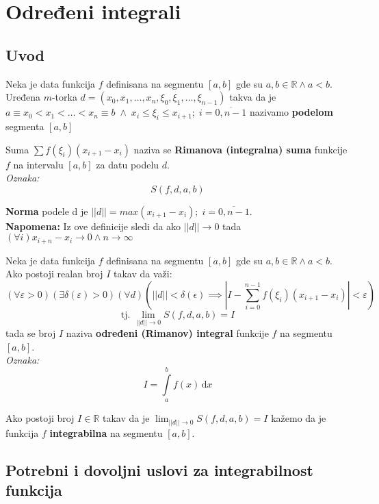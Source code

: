 \section{Određeni integrali}
\subsection{Uvod}
\begin{definition}
	Neka je data funkcija $f$ definisana na segmentu $[a, b]$ gde su $a, b \in \mathbb{R} \land a<b$. Uređena $m$-torka $d = (x_0, x_1, \ldots, x_n, \xi_0, \xi_1, \ldots, \xi_{n-1})$ takva da je $a \equiv x_0 < x_1 < \ldots < x_n \equiv b\; \land \;x_i \leq \xi_i \leq x_{i+1}; \; i=\overline{0, n-1}$ nazivamo \textbf{podelom} segmenta $[a, b]$
\end{definition}
\begin{definition}
	 Suma $\sum f(\xi_i)(x_{i+1}-x_i)$ naziva se \textbf{Rimanova (integralna) suma} funkcije $f$ na intervalu $[a, b]$ za datu podelu $d$.\\
	 \textit{Oznaka:} $$S(f, d, a, b)$$
\end{definition}
\begin{definition}
	\textbf{Norma} podele d je $||d|| = max(x_{i+1}-x_i); \; i=\overline{0,n-1}$.\\
	\textbf{Napomena:} Iz ove definicije sledi da ako $||d|| \to 0$ tada $(\forall i) x_{i+n}-x_i \to 0 \land n \to \infty$
\end{definition}
\begin{definition}
	Neka je data funkcija $f$ definisana na segmentu $[a, b]$ gde su $a, b \in \mathbb{R} \land a<b$. Ako postoji realan broj $I$ takav da važi:
	$$(\forall \varepsilon > 0)(\exists \delta(\varepsilon)>0)(\forall d)\left(||d||<\delta(\epsilon) \implies \left|I- \sum^{n-1}_{i = 0}f(\xi_i)(x_{i+1}-x_i) \right|<\varepsilon\right)$$
	$$\text{tj. } \lim_{||d||\to 0} S(f, d, a, b) = I$$ tada se broj $I$ naziva \textbf{određeni (Rimanov) integral} funkcije $f$ na segmentu $[a, b]$. \\
	\textit{Oznaka:} $$I = \int\limits^b_a f(x)\, \mathrm{d}x$$
\end{definition}
\begin{definition}
	Ako postoji broj $I\in \mathbb{R}$ takav da je $\lim_{||d||\to 0} S(f, d, a, b) = I$ kažemo da je funkcija $f$ \textbf{integrabilna} na segmentu $[a,b]$.
\end{definition}


\subsection{Potrebni i dovoljni uslovi za integrabilnost funkcija}

